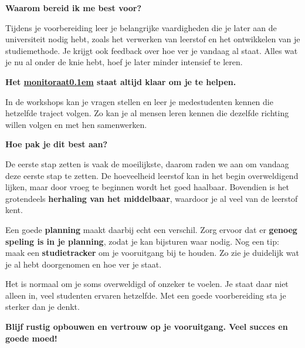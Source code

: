 \documentclass[12pt,a4paper]{article}
\begin{document}
\vspace{0.4em}



{\selectfont\bfseries\textcolor{kulaccent}{Waarom bereid ik me best voor?}}

Tijdens je voorbereiding leer je belangrijke vaardigheden die je later aan de universiteit nodig hebt, zoals het verwerken van leerstof en het ontwikkelen van je studiemethode. Je krijgt ook feedback over hoe ver je vandaag al staat. Alles wat je nu al onder de knie hebt, hoef je later minder intensief te leren.

{\selectfont\bfseries\textcolor{kulaccent}{Het \href{https://med.kuleuven.be/nl/studeren/studentenportaal/studieloopbaanbegeleiding/monitoraat}{monitoraat\kern0.1em\scalebox{0.6}{\faLink}} staat altijd klaar om je te helpen.}}

In de workshops kan je vragen stellen en leer je medestudenten kennen die hetzelfde traject volgen. Zo kan je al mensen leren kennen die dezelfde richting willen volgen en met hen samenwerken.



\vspace{0.4em}

\begin{tcolorbox}[
    colback=kulblue,
    colframe=kulblue,
    boxrule=0pt,
    arc=0pt,
    left=5mm,
    right=5mm,
    top=4mm,
    bottom=4mm,
    enlarge left by=0mm,
    enlarge right by=0mm,
]


{\selectfont\bfseries\textcolor{kulaccent}{Hoe pak je dit best aan?}}
\vspace{0.4em}

De eerste stap zetten is vaak de moeilijkste, daarom raden we aan om vandaag deze eerste stap te zetten. De hoeveelheid leerstof kan in het begin overweldigend lijken, maar door vroeg te beginnen wordt het goed haalbaar. Bovendien is het grotendeels \textbf{herhaling van het middelbaar}, waardoor je al veel van de leerstof kent.

Een goede \textbf{planning} maakt daarbij echt een verschil. Zorg ervoor dat er \textbf{genoeg speling is in je planning}, zodat je kan bijsturen waar nodig. Nog een tip: maak een \textbf{studietracker} om je vooruitgang bij te houden. Zo zie je duidelijk wat je al hebt doorgenomen en hoe ver je staat.


Het is normaal om je soms overweldigd of onzeker te voelen. Je staat daar niet alleen in, veel studenten ervaren hetzelfde. Met een goede voorbereiding sta je sterker dan je denkt.

\end{tcolorbox}


\vspace{0.4em}

{\textbf{\textcolor{kulaccent}{Blijf rustig opbouwen en vertrouw op je vooruitgang. Veel succes en goede moed!}}}
\end{document}
